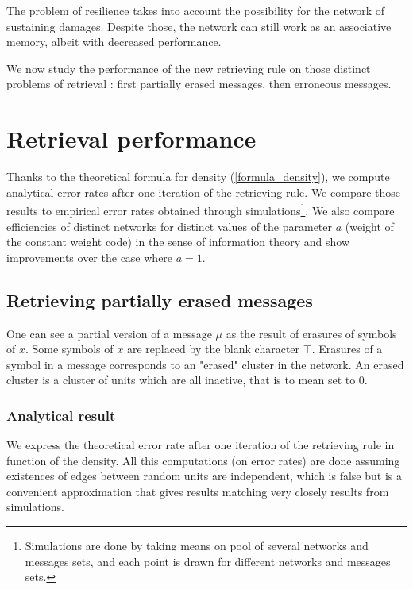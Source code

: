\documentclass[english,10pt,twocolumn]{IEEEtran}
\theoremstyle{definition}
\begin{document}
	The problem of resilience takes into account the possibility for the network of sustaining damages. Despite those, the network can still work as an associative memory, albeit with decreased performance.
	
			
	
		
	
	We now study the performance of the new retrieving rule on those distinct problems of retrieval : first partially erased messages, then erroneous messages.%
	
	\section{Retrieval performance}	
	
	Thanks to the theoretical formula for density (\ref{formula_density}), we compute analytical error rates after one iteration of the retrieving rule. We compare those results to empirical error rates obtained through simulations\footnote{Simulations are done by taking means on pool of several networks and messages sets, and each point is drawn for different networks and messages sets.}. We also compare efficiencies of distinct networks for distinct values of the parameter $a$ (weight of the constant weight code) in the sense of information theory and show improvements over the case where $a = 1$.
	
	
	
		
	
	\subsection{Retrieving partially erased messages}		
		
	One can see a partial version of a message $\mu$ as the result of erasures of symbols of $x$. Some symbols of $x$ are replaced by the blank character $\intercal$.	Erasures of a symbol in a message corresponds to an "erased" cluster in the network. An erased cluster is a cluster of units which are all inactive, that is to mean set to $0$.
	
	\subsubsection{Analytical result}
	
	We express the theoretical error rate after one iteration of the retrieving rule in function of the density. All this computations (on error rates) are done assuming existences of edges between random units are independent, which is false but is a convenient approximation that gives results matching very closely results from simulations.
	
\end{document}

